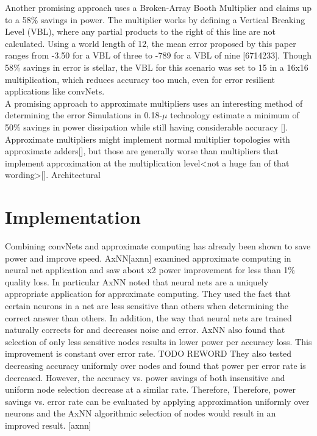 \documentclass[conference]{IEEEtran}
\begin{document}
	\indent Another promising approach uses a Broken-Array Booth Multiplier and claims up to a 58\% savings in power. The multiplier works by defining a Vertical Breaking Level (VBL), where any partial products to the right of this line are not calculated. Using a world length of 12, the mean error proposed by this paper ranges from -3.50 for a VBL of three to -789 for a VBL of nine [6714233]. Though 58\% savings in error is stellar, the VBL for this scenario was set to 15 in a 16x16 multiplication, which reduces accuracy too much, even for error resilient applications like convNets. \\ 

	\indent A promising approach to approximate multipliers uses an interesting method of determining the error Simulations in 0.18-$\mu$ technology estimate a minimum of 50\% savings in power dissipation while still having considerable accuracy [].\\
	\indent Approximate multipliers might implement normal multiplier topologies with approximate adders[], but those are generally worse than multipliers that implement approximation at the multiplication level<not a huge fan of that wording>[]. Architectural \\

\section{Implementation}
	\indent Combining convNets and approximate computing has already been shown to save power and improve speed. AxNN[axnn] examined approximate computing in neural net application and saw about x2 power improvement for less than 1\% quality loss. In particular AxNN noted that neural nets are a uniquely appropriate application for approximate computing. They used the fact that certain neurons in a net are less sensitive than others when determining the correct answer than others. In addition, the way that neural nets are trained naturally corrects for and decreases noise and error. AxNN also found that selection of only less sensitive nodes results in lower power per accuracy loss. This improvement is constant over error rate. TODO REWORD
They also tested decreasing accuracy uniformly over nodes and found that power per error rate is decreased. However, the accuracy vs. power savings of both insensitive and uniform node selection decrease at a similar rate. Therefore, 
Therefore, power savings vs. error rate can be evaluated by applying approximation uniformly over neurons and the AxNN algorithmic selection of nodes would result in an improved result. [axnn] \\ 
\end{document}
